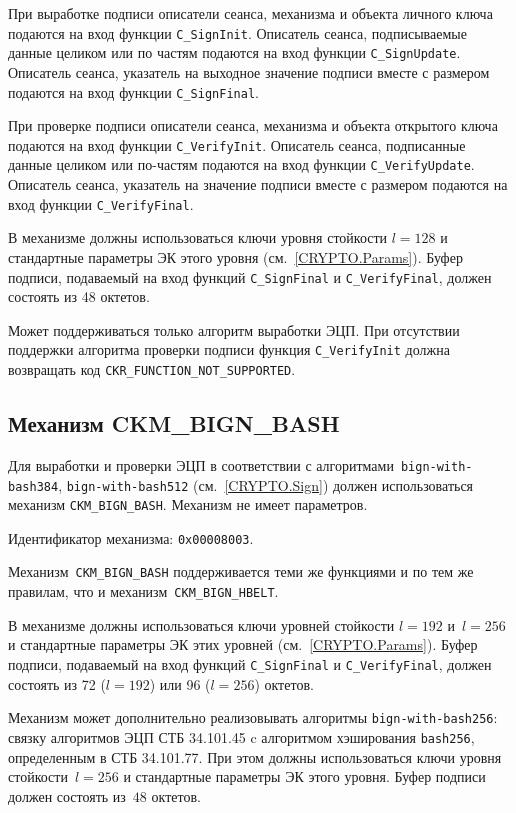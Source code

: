 При выработке подписи описатели сеанса, механизма и объекта
личного ключа подаются на вход функции \verb|C_SignInit|.
Описатель сеанса, подписываемые данные целиком или по частям подаются
на вход функции \verb|C_SignUpdate|.
Описатель сеанса, указатель на выходное значение подписи вместе с размером
подаются на вход функции \verb|C_SignFinal|.

При проверке подписи описатели сеанса, механизма и объекта
открытого ключа подаются на вход функции \verb|C_VerifyInit|.
Описатель сеанса, подписанные данные целиком или по-частям подаются
на вход функции \verb|C_VerifyUpdate|.
Описатель сеанса, указатель на значение подписи вместе с размером
подаются на вход функции \verb|C_VerifyFinal|.

В механизме должны использоваться ключи уровня стойкости $l=128$ 
и стандартные параметры ЭК этого уровня (см.~\ref{CRYPTO.Params}).
% 
Буфер подписи, подаваемый на вход функций \verb|C_SignFinal| и 
\verb|C_VerifyFinal|, должен состоять из 48 октетов.

Может поддерживаться только алгоритм выработки ЭЦП.
При отсутствии поддержки алгоритма проверки подписи
функция \verb|C_VerifyInit| должна возвращать код 
\verb|CKR_FUNCTION_NOT_SUPPORTED|.

\subsection{Механизм CKM\_BIGN\_BASH}\label{CRYPTOKI.SignBash}

Для выработки и проверки ЭЦП в соответствии с 
алгоритмами~\texttt{bign-with-bash384}, \texttt{bign-with-bash512} 
(см.~\ref{CRYPTO.Sign}) должен использоваться механизм 
\verb|CKM_BIGN_BASH|.
%
Механизм не имеет параметров.

Идентификатор механизма: \texttt{0x00008003}.

Механизм~\verb|CKM_BIGN_BASH| поддерживается теми же функциями и по тем же 
правилам, что и механизм~\verb|CKM_BIGN_HBELT|.

В механизме должны использоваться ключи уровней стойкости $l=192$ и~$l=256$
и стандартные параметры ЭК этих уровней (см.~\ref{CRYPTO.Params}).
% 
Буфер подписи, подаваемый на вход функций \verb|C_SignFinal| и 
\verb|C_VerifyFinal|, должен состоять из 72 ($l=192$) или 96 ($l=256$) 
октетов. 

Механизм может дополнительно реализовывать алгоритмы 
\texttt{bign-with-bash256}: связку алгоритмов ЭЦП СТБ 34.101.45 c 
алгоритмом хэширования \texttt{bash256}, определенным в СТБ 34.101.77.
При этом должны использоваться ключи уровня стойкости~$l=256$
и стандартные параметры ЭК этого уровня. 
Буфер подписи должен состоять из~$48$ октетов.

